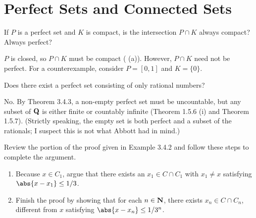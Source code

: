 \documentclass{lew98_solutions}
\begin{document}
\section{Perfect Sets and Connected Sets}
\label{sec:3.4}

\begin{exercise}
\label{ex:3.4.1}
    If \( P \) is a perfect set and \( K \) is compact, is the intersection \( P \cap K \) always compact? Always perfect?
\end{exercise}

\begin{solution}
    \( P \) is closed, so \( P \cap K \) must be compact ( (a)). However, \( P \cap K \) need not be perfect. For a counterexample, consider \( P = [0, 1] \) and \( K = \{ 0 \} \).
\end{solution}

\begin{exercise}
\label{ex:3.4.2}
    Does there exist a perfect set consisting of only rational numbers?
\end{exercise}

\begin{solution}
    No. By Theorem 3.4.3, a non-empty perfect set must be uncountable, but any subset of \( \mathbf{Q} \) is either finite or countably infinite (Theorem 1.5.6 (i) and Theorem 1.5.7). (Strictly speaking, the empty set is both perfect and a subset of the rationals; I suspect this is not what Abbott had in mind.)
\end{solution}

\begin{exercise}
\label{ex:3.4.3}
    Review the portion of the proof given in Example 3.4.2 and follow these steps to complete the argument.
    \begin{enumerate}
        \item Because \( x \in C_1 \), argue that there exists an \( x_1 \in C \cap C_1 \) with \( x_1 \neq x \) satisfying \( \abs{x - x_1} \leq 1/3 \).

        \item Finish the proof by showing that for each \( n \in \mathbf{N} \), there exists \( x_n \in C \cap C_n \), different from \( x \) satisfying \( \abs{x - x_n} \leq 1/3^n \).
    \end{enumerate}
\end{exercise}
\end{document}
